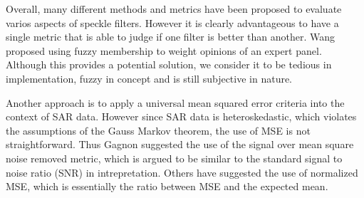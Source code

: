 \documentclass[journal]{IEEEtran}
\begin{document}
Overall, many different methods and metrics have been proposed to evaluate varios aspects of speckle filters. 
However it is clearly advantageous to have a single metric that is able to judge if one filter is better than another. 
Wang \cite{Wang_2005_MIPR} proposed using fuzzy membership to weight opinions of an expert panel. 
Although this provides a potential solution, we consider it to be tedious in implementation, fuzzy in concept and is still subjective in nature.


Another approach is to apply a universal mean squared error criteria into the context of SAR data. 
However since SAR data is heteroskedastic, which violates the assumptions of the Gauss Markov theorem, the use of MSE is not straightforward. 
Thus Gagnon \cite{Gagnon_SPIEProc_1997} suggested the use of the signal over mean square noise removed metric, which is argued to be similar to the standard signal to noise ratio (SNR) in intrepretation. 
Others have suggested the use of normalized MSE, which is essentially the ratio between MSE and the expected mean.

\end{document}
